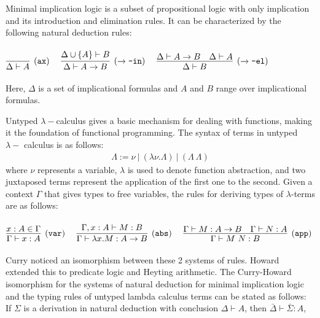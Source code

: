 \documentclass{article}
\begin{document}
	Minimal implication logic is a subset
	of propositional logic with only 
	implication and its introduction 
	and elimination rules. It can be 
	characterized by the following 
	natural deduction rules:\\ \\
	\begin{math}
		\infer[(\texttt{ax})]{\Delta \vdash A}{}
		\ \ \ \ 
		\infer[(\to\texttt{-in})]{\Delta \vdash A \to B}
		{\Delta \cup \{A\} \vdash B}
		\ \ \ \ 
		\infer[(\to\texttt{-el})]{\Delta \vdash B}
		{\Delta \vdash A \to B & \Delta \vdash A}
	\end{math} 
	\\ \\
	Here, $\Delta$ is a set of implicational 
	formulas and $A$ and $B$ range over 
	implicational formulas. 
	
	Untyped $\lambda-$calculus gives a basic 
	mechanism for dealing with functions, making 
	it the foundation of functional programming.
	The syntax of terms in untyped $\lambda-$
	calculus is as follows:
	\begin{align*}
		\Lambda := \nu\ |\ (\lambda \nu.\Lambda)
		\ |\ (\Lambda\ \Lambda)
	\end{align*}  
	where $\nu$ represents a variable, $\lambda$ 
	is used to denote function abstraction, 
	and two juxtaposed terms represent the 
	application of the first one to the second.
	Given a context $\Gamma$ that gives types 
	to free variables, the rules for deriving 
	types of $\lambda$-terms are as follows: \\ \\
	\begin{math}
		\infer[(\texttt{var})]{\Gamma \vdash x : A}
		{x : A \in \Gamma}
		\ \ \ \ 
		\infer[(\texttt{abs})]
		{\Gamma \vdash \lambda x. M : A \to B}
		{\Gamma, x : A \vdash M : B}
		\ \ \ \ 
		\infer[(\texttt{app})]{\Gamma \vdash M\ N : B}
		{\Gamma \vdash M : A \to B & \Gamma \vdash N : A}
	\end{math} 
	\\ \\
	Curry noticed an isomorphism between these 
	2 systems of rules. Howard extended this to 
	predicate logic and Heyting arithmetic. The 
	Curry-Howard isomorphism for the systems 
	of natural deduction for minimal implication 
	logic and the typing rules of untyped lambda 
	calculus terms can be stated as follows:\\

	\noindent If $\Sigma$ is a derivation in natural 
	deduction with conclusion $\Delta \vdash A$,
	then $\bar{\Delta} \vdash \bar{\Sigma} : A$,\\
	
\end{document}
